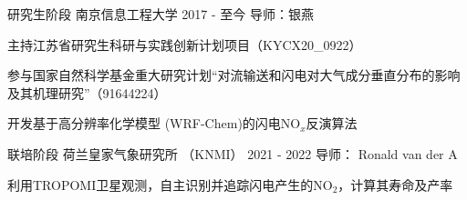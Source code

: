 

\begin{cventries}

  \cventry
    {研究生阶段} %
    {南京信息工程大学} %
    {2017 - 至今} %
    {导师：银燕} %
    {
      \begin{cvitems} %
        \item {主持江苏省研究生科研与实践创新计划项目（KYCX20\_0922）}
        \item {参与国家自然科学基金重大研究计划“对流输送和闪电对大气成分垂直分布的影响及其机理研究”（91644224）}
        \item {开发基于高分辨率化学模型 (WRF-Chem)的闪电NO$_x$反演算法}
      \end{cvitems}
    }

  \cventry
    {联培阶段} %
    {荷兰皇家气象研究所 （KNMI）} %
    {2021 - 2022} %
    {导师： Ronald van der A} %
    {
      \begin{cvitems} %
        \item {利用TROPOMI卫星观测，自主识别并追踪闪电产生的NO$_2$，计算其寿命及产率}
      \end{cvitems}
    }



\end{cventries}
